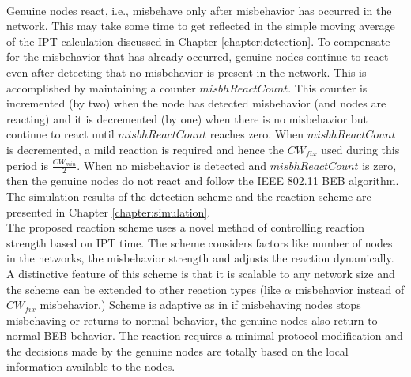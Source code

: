 \documentclass[12pt,letterpaper,english]{article}
\begin{document}
\\
\indent Genuine nodes react, i.e., misbehave only after misbehavior has occurred in the network. 
This may take some time to get reflected in the simple moving average of the IPT calculation discussed in Chapter \ref{chapter:detection}. 
To compensate for the misbehavior that has already occurred, genuine nodes continue to react even after detecting that no misbehavior is present in the network. 
This is accomplished by maintaining a counter $misbhReactCount$. This counter is incremented (by two) when the node has detected misbehavior (and nodes are reacting) and it is decremented (by one) when there is no misbehavior but continue to react until $misbhReactCount$ reaches zero. When $misbhReactCount$ is decremented, a mild reaction is required and hence the $CW_{fix}$ used during this period is $\frac{CW_{min}}{2}$. 
When no misbehavior is detected and $misbhReactCount$ is zero, then the genuine nodes do not react and follow the IEEE 802.11 BEB algorithm.
The simulation results of the detection scheme and the reaction scheme are presented in Chapter \ref{chapter:simulation}.
\\
\indent The proposed reaction scheme uses a novel method of controlling reaction strength based on IPT time. The scheme considers factors like number of nodes in the networks, the misbehavior strength and adjusts the reaction dynamically. A distinctive feature of this scheme is that it is scalable to any network size and the scheme can be extended to other reaction types (like $\alpha$ misbehavior instead of $CW_{fix}$ misbehavior.) Scheme is adaptive as in if misbehaving nodes stops misbehaving or returns to normal behavior, the genuine nodes also return to normal BEB behavior. The reaction requires a minimal protocol modification and the decisions made by the genuine nodes are totally based on the local information available to the nodes.
\end{document}
